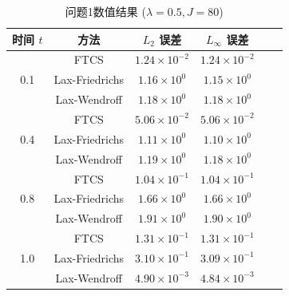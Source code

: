 \documentclass[12pt,a4paper]{article}
\begin{document}
            \begin{table}[H]
                \centering
                \caption{问题1数值结果 ($ \lambda = 0.5, J = 80 $)}
                \begin{tabular}{cccccc}
                    \toprule
                    时间 $ t $ & 方法 & $ L_2 $ 误差 & $ L_\infty $ 误差 \\
                    \midrule
                    \multirow{3}{*}{0.1} & FTCS & $ 1.24 \times 10^{-2} $ & $ 1.24 \times 10^{-2} $ \\
                    & Lax-Friedrichs & $ 1.16 \times 10^{0} $ & $ 1.15 \times 10^{0} $ \\
                    & Lax-Wendroff & $ 1.18 \times 10^{0} $ & $ 1.18 \times 10^{0} $ \\
                    \midrule
                    \multirow{3}{*}{0.4} & FTCS & $ 5.06 \times 10^{-2} $ & $ 5.06 \times 10^{-2} $ \\
                    & Lax-Friedrichs & $ 1.11 \times 10^{0} $ & $ 1.10 \times 10^{0} $ \\
                    & Lax-Wendroff & $ 1.19 \times 10^{0} $ & $ 1.18 \times 10^{0} $ \\
                    \midrule
                    \multirow{3}{*}{0.8} & FTCS & $ 1.04 \times 10^{-1} $ & $ 1.04 \times 10^{-1} $ \\
                    & Lax-Friedrichs & $ 1.66 \times 10^{0} $ & $ 1.66 \times 10^{0} $ \\
                    & Lax-Wendroff & $ 1.91 \times 10^{0} $ & $ 1.90 \times 10^{0} $ \\
                    \midrule
                    \multirow{3}{*}{1.0} & FTCS & $ 1.31 \times 10^{-1} $ & $ 1.31 \times 10^{-1} $ \\
                    & Lax-Friedrichs & $ 3.10 \times 10^{-1} $ & $ 3.09 \times 10^{-1} $ \\
                    & Lax-Wendroff & $ 4.90 \times 10^{-3} $ & $ 4.84 \times 10^{-3} $ \\
                    \bottomrule
                \end{tabular}
            \end{table}
\end{document}
